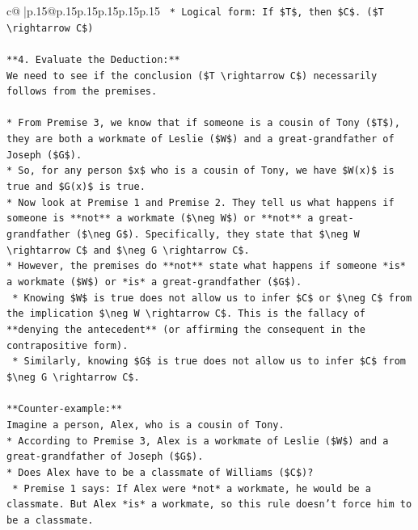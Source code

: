 \documentclass{article}
\begin{document}
{\begin{supertabular}{c@{$\;$}|p{.15\linewidth}@{}p{.15\linewidth}p{.15\linewidth}p{.15\linewidth}p{.15\linewidth}p{.15\linewidth}}
{{{\texttt{    *   Logical form: If \$T\$, then \$C\$. (\$T \textbackslash{}rightarrow C\$)} \\
\\ 
\texttt{**4. Evaluate the Deduction:**} \\
\texttt{We need to see if the conclusion (\$T \textbackslash{}rightarrow C\$) necessarily follows from the premises.} \\
\\ 
\texttt{*   From Premise 3, we know that if someone is a cousin of Tony (\$T\$), they are both a workmate of Leslie (\$W\$) and a great{-}grandfather of Joseph (\$G\$).} \\
\texttt{*   So, for any person \$x\$ who is a cousin of Tony, we have \$W(x)\$ is true and \$G(x)\$ is true.} \\
\texttt{*   Now look at Premise 1 and Premise 2. They tell us what happens if someone is **not** a workmate (\$\textbackslash{}neg W\$) or **not** a great{-}grandfather (\$\textbackslash{}neg G\$). Specifically, they state that \$\textbackslash{}neg W \textbackslash{}rightarrow C\$ and \$\textbackslash{}neg G \textbackslash{}rightarrow C\$.} \\
\texttt{*   However, the premises do **not** state what happens if someone *is* a workmate (\$W\$) or *is* a great{-}grandfather (\$G\$).} \\
\texttt{    *   Knowing \$W\$ is true does not allow us to infer \$C\$ or \$\textbackslash{}neg C\$ from the implication \$\textbackslash{}neg W \textbackslash{}rightarrow C\$. This is the fallacy of **denying the antecedent** (or affirming the consequent in the contrapositive form).} \\
\texttt{    *   Similarly, knowing \$G\$ is true does not allow us to infer \$C\$ from \$\textbackslash{}neg G \textbackslash{}rightarrow C\$.} \\
\\ 
\texttt{**Counter{-}example:**} \\
\texttt{Imagine a person, Alex, who is a cousin of Tony.} \\
\texttt{*   According to Premise 3, Alex is a workmate of Leslie (\$W\$) and a great{-}grandfather of Joseph (\$G\$).} \\
\texttt{*   Does Alex have to be a classmate of Williams (\$C\$)?} \\
\texttt{    *   Premise 1 says: If Alex were *not* a workmate, he would be a classmate. But Alex *is* a workmate, so this rule doesn't force him to be a classmate.} \\
}}}
\end{supertabular}}
\end{document}
